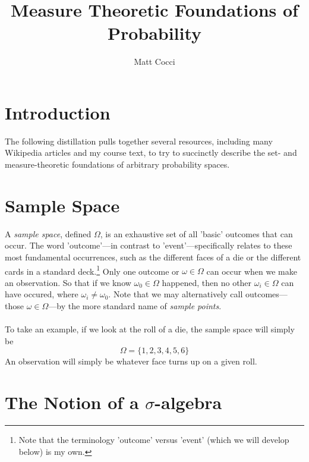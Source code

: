 \documentclass[a4paper,12pt]{scrartcl}
\author{Matt Cocci}
\title{Measure Theoretic Foundations of Probability}
\begin{document}
\maketitle

\section{Introduction}

The following distillation pulls together several resources, including many Wikipedia articles and my course text, to try to 
succinctly describe the set- and measure-theoretic foundations of  arbitrary probability spaces.  

\section{Sample Space}

A \emph{sample space}, defined $\Omega$, is an exhaustive set of 
all 'basic' 
outcomes that can occur.  The word 'outcome'---in contrast to 
'event'---specifically relates to these most fundamental occurrences, 
such as the different faces of a die or the different cards in a 
standard deck.\footnote{Note that the terminology 'outcome' versus 
'event' (which we will develop below) is my own.} Only one outcome or 
$\omega \in \Omega$ can occur when we make an observation. 
So that if we know $\omega_0 \in \Omega$
happened, then no other $\omega_i \in \Omega$ can have occured,  
where $\omega_i\neq\omega_0$.  Note that we may alternatively call 
outcomes---those $\omega \in \Omega$---by the more standard name of
\emph{sample points}.
\\
\\
To take an example,
if we look at the roll of a die, the sample space will simply be
   \[\Omega = \{1, 2, 3, 4, 5, 6 \} \]
An observation will simply be whatever face turns up on a given roll.

\section{The Notion of a $\sigma$-algebra}
\end{document}
